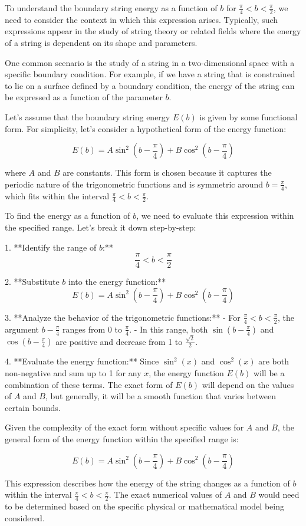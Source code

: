 To understand the boundary string energy as a function of \( b \) for \( \frac{\pi}{4} < b < \frac{\pi}{2} \), we need to consider the context in which this expression arises. Typically, such expressions appear in the study of string theory or related fields where the energy of a string is dependent on its shape and parameters.

One common scenario is the study of a string in a two-dimensional space with a specific boundary condition. For example, if we have a string that is constrained to lie on a surface defined by a boundary condition, the energy of the string can be expressed as a function of the parameter \( b \).

Let's assume that the boundary string energy \( E(b) \) is given by some functional form. For simplicity, let's consider a hypothetical form of the energy function:

\[ E(b) = A \sin^2(b - \frac{\pi}{4}) + B \cos^2(b - \frac{\pi}{4}) \]

where \( A \) and \( B \) are constants. This form is chosen because it captures the periodic nature of the trigonometric functions and is symmetric around \( b = \frac{\pi}{4} \), which fits within the interval \( \frac{\pi}{4} < b < \frac{\pi}{2} \).

To find the energy as a function of \( b \), we need to evaluate this expression within the specified range. Let's break it down step-by-step:

1. **Identify the range of \( b \):**
   \[ \frac{\pi}{4} < b < \frac{\pi}{2} \]

2. **Substitute \( b \) into the energy function:**
   \[ E(b) = A \sin^2(b - \frac{\pi}{4}) + B \cos^2(b - \frac{\pi}{4}) \]

3. **Analyze the behavior of the trigonometric functions:**
   - For \( \frac{\pi}{4} < b < \frac{\pi}{2} \), the argument \( b - \frac{\pi}{4} \) ranges from 0 to \(\frac{\pi}{4}\).
   - In this range, both \(\sin(b - \frac{\pi}{4})\) and \(\cos(b - \frac{\pi}{4})\) are positive and decrease from 1 to \(\frac{\sqrt{2}}{2}\).

4. **Evaluate the energy function:**
   Since \(\sin^2(x)\) and \(\cos^2(x)\) are both non-negative and sum up to 1 for any \( x \), the energy function \( E(b) \) will be a combination of these terms. The exact form of \( E(b) \) will depend on the values of \( A \) and \( B \), but generally, it will be a smooth function that varies between certain bounds.

Given the complexity of the exact form without specific values for \( A \) and \( B \), the general form of the energy function within the specified range is:

\[ E(b) = A \sin^2(b - \frac{\pi}{4}) + B \cos^2(b - \frac{\pi}{4}) \]

This expression describes how the energy of the string changes as a function of \( b \) within the interval \( \frac{\pi}{4} < b < \frac{\pi}{2} \). The exact numerical values of \( A \) and \( B \) would need to be determined based on the specific physical or mathematical model being considered.